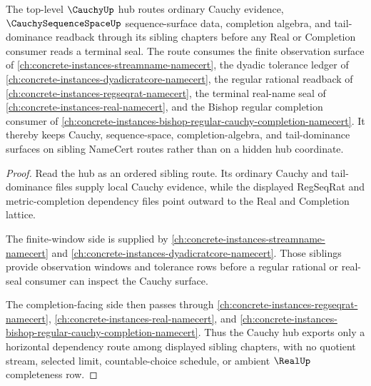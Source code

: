 \begin{theorem}
\label{thm:cauchy-top-level-sibling-route}
The top-level $\CauchyUp$ hub routes ordinary Cauchy evidence, $\CauchySequenceSpaceUp$ sequence-surface data, completion algebra, and tail-dominance readback through its sibling chapters before any Real or Completion consumer reads a terminal seal. The route consumes the finite observation surface of \autoref{ch:concrete-instances-streamname-namecert}, the dyadic tolerance ledger of \autoref{ch:concrete-instances-dyadicratcore-namecert}, the regular rational readback of \autoref{ch:concrete-instances-regseqrat-namecert}, the terminal real-name seal of \autoref{ch:concrete-instances-real-namecert}, and the Bishop regular completion consumer of \autoref{ch:concrete-instances-bishop-regular-cauchy-completion-namecert}. It thereby keeps Cauchy, sequence-space, completion-algebra, and tail-dominance surfaces on sibling NameCert routes rather than on a hidden hub coordinate.
\end{theorem}
\begin{proof}
Read the hub as an ordered sibling route. Its ordinary Cauchy and tail-dominance files supply local Cauchy evidence, while the displayed RegSeqRat and metric-completion dependency files point outward to the Real and Completion lattice.

The finite-window side is supplied by \autoref{ch:concrete-instances-streamname-namecert} and \autoref{ch:concrete-instances-dyadicratcore-namecert}. Those siblings provide observation windows and tolerance rows before a regular rational or real-seal consumer can inspect the Cauchy surface.

The completion-facing side then passes through \autoref{ch:concrete-instances-regseqrat-namecert}, \autoref{ch:concrete-instances-real-namecert}, and \autoref{ch:concrete-instances-bishop-regular-cauchy-completion-namecert}. Thus the Cauchy hub exports only a horizontal dependency route among displayed sibling chapters, with no quotient stream, selected limit, countable-choice schedule, or ambient $\RealUp$ completeness row.
\end{proof}

